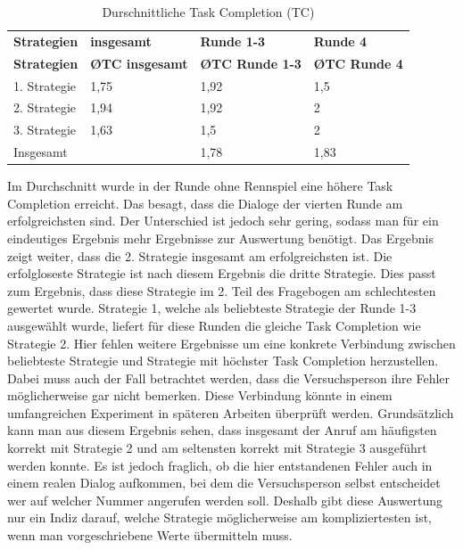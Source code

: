 \documentclass[12pt,a4paper]{scrartcl}
\begin{document}
\begin{longtable}{p{3cm}p{3cm}p{3cm}p{3cm} }
	\label{TCV1}\\
	\caption[Durschnittliche Task Completion (TC)]{Durschnittliche Task Completion (TC)}\\
	\hline
\textbf{Strategien}&\textbf{insgesamt}&\textbf{Runde 1-3} &\textbf{Runde 4}\\
	\hline
	\endfirsthead
	\hline
	\textbf{Strategien}&\textbf{\O TC insgesamt}&\textbf{\O TC Runde 1-3} &\textbf{\O TC Runde 4}\\
	\hline
	\endhead
1. Strategie & 1,75 & 1,92 & 1,5  \\
2. Strategie & 1,94 & 1,92 & 2  \\
3. Strategie & 1,63 & 1,5 & 2  \\
\hline
Insgesamt & & 1,78 & 1,83 \\ 
\hline
\end{longtable}

Im Durchschnitt wurde in der Runde ohne Rennspiel eine höhere Task Completion erreicht. Das besagt, dass die Dialoge der vierten Runde am erfolgreichsten sind. Der Unterschied ist jedoch sehr gering, sodass man für ein eindeutiges Ergebnis mehr Ergebnisse zur Auswertung benötigt. Das Ergebnis zeigt weiter, dass die 2. Strategie insgesamt am erfolgreichsten ist. Die erfolgloseste Strategie ist nach diesem Ergebnis die dritte Strategie. Dies passt zum Ergebnis, dass diese Strategie im 2. Teil des Fragebogen am schlechtesten gewertet wurde. Strategie 1, welche als beliebteste Strategie der Runde 1-3 ausgewählt wurde, liefert für diese Runden die gleiche Task Completion wie Strategie 2. Hier fehlen weitere Ergebnisse um eine konkrete Verbindung zwischen beliebteste Strategie und Strategie mit höchster Task Completion herzustellen. Dabei muss auch der Fall betrachtet werden, dass die Versuchsperson ihre Fehler möglicherweise gar nicht bemerken. Diese Verbindung könnte in einem umfangreichen Experiment in späteren Arbeiten überprüft werden. 
Grundsätzlich kann man aus diesem Ergebnis sehen, dass insgesamt der Anruf am häufigsten korrekt mit Strategie 2 und am seltensten korrekt mit Strategie 3 ausgeführt werden konnte. \newline
Es ist jedoch fraglich, ob die hier entstandenen Fehler auch in einem realen Dialog aufkommen, bei dem die Versuchsperson selbst entscheidet wer auf welcher Nummer angerufen werden soll. Deshalb gibt diese Auswertung nur ein Indiz darauf, welche Strategie möglicherweise am kompliziertesten ist, wenn man vorgeschriebene Werte übermitteln muss. 
\end{document}
